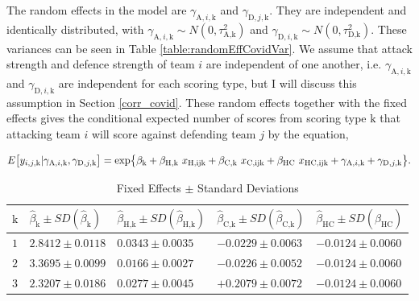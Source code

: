 The random effects in the model are $\gamma_{\text{A},i,\text{k}}$ and $\gamma_{\text{D},j,\text{k}}$. They are independent and identically distributed, with $\gamma_{\text{A},i,\text{k}} \sim N(0,\tau_{\text{A},\text{k}}^2)$ and $\gamma_{\text{D},i,\text{k}} \sim N(0,\tau_{\text{D},\text{k}}^2)$. These variances can be seen in Table \ref{table:randomEffCovidVar}. We assume that attack strength and defence strength of team $i$ are independent of one another, i.e. $\gamma_{\text{A},i,\text{k}}$ and $\gamma_{\text{D},i,\text{k}}$ are independent for each scoring type, but I will discuss this assumption in Section \ref{corr_covid}. These random effects together with the fixed effects gives the conditional expected number of scores from scoring type $\text{k}$ that attacking team $i$ will score against defending team $j$ by the equation,

\begin{equation}
    E\big[y_{i,j,\text{k}} | \gamma_{\text{A},i,\text{k}}, \gamma_{\text{D},j,\text{k}}\big] = \text{exp}\big\{ \beta_\text{k} + \beta_{\text{H},\text{k}} \ x_\text{H,ij\text{k}} + \beta_{\text{C},\text{k}} \ x_\text{C,ij\text{k}} + \beta_\text{HC} \ x_\text{HC,ij\text{k}} + \gamma_{\text{A},i,\text{k}} + \gamma_{\text{D},j,\text{k}} \big\}.
\end{equation}

\begin{table}[!ht]
\centering
\begin{tabular}{ |p{.3cm}|p{3cm}|p{3cm}|p{3cm}|p{3cm}|  }
    \hline
    $\text{k}$ & $\hat\beta_\text{k} \pm SD(\hat\beta_\text{k})$& $\hat\beta_{\text{H},\text{k}} \pm SD(\hat\beta_{\text{H},\text{k}})$ & $\hat\beta_{\text{C},\text{k}} \pm SD(\hat\beta_{\text{C},\text{k}})$ & $\hat\beta_\text{HC} \pm SD(\hat\beta_\text{HC})$ \\
    \hline
    $1$ & $2.8412 \pm 0.0118$ & $0.0343 \pm 0.0035$ & $-0.0229 \pm 0.0063$ & $-0.0124 \pm 0.0060$ \\
    $2$ & $3.3695 \pm 0.0099$ & $0.0166 \pm 0.0027$ & $-0.0226 \pm 0.0052$ & $-0.0124 \pm 0.0060$ \\
    $3$ & $2.3207 \pm 0.0186$ & $0.0277 \pm 0.0045$ & $+0.2079 \pm 0.0072$ & $-0.0124 \pm 0.0060$ \\
    \hline
\end{tabular}
\caption{Fixed Effects $\pm$ Standard Deviations}
\label{table:fixedEffCovid}
\end{table}


